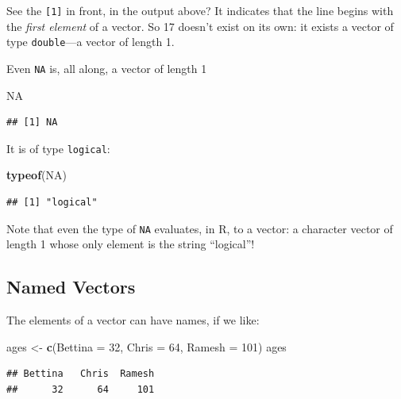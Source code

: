 \documentclass[]{book}
\makeatletter
\newenvironment{Shaded}{\begin{snugshade}}{\end{snugshade}}
\newcommand{\KeywordTok}[1]{\textcolor[rgb]{0.13,0.29,0.53}{\textbf{{#1}}}}
\newcommand{\DataTypeTok}[1]{\textcolor[rgb]{0.13,0.29,0.53}{{#1}}}
\newcommand{\DecValTok}[1]{\textcolor[rgb]{0.00,0.00,0.81}{{#1}}}
\newcommand{\StringTok}[1]{\textcolor[rgb]{0.31,0.60,0.02}{{#1}}}
\newcommand{\OtherTok}[1]{\textcolor[rgb]{0.56,0.35,0.01}{{#1}}}
\newcommand{\NormalTok}[1]{{#1}}
\newenvironment{kframe}{%
\medskip{}
\setlength{\fboxsep}{.8em}
 \def\at@end@of@kframe{}%
 \ifinner\ifhmode%
  \def\at@end@of@kframe{\end{minipage}}%
  \begin{minipage}{\columnwidth}%
 \fi\fi%
 \def\FrameCommand##1{\hskip\@totalleftmargin \hskip-\fboxsep
 \colorbox{shadecolor}{##1}\hskip-\fboxsep
     \hskip-\linewidth \hskip-\@totalleftmargin \hskip\columnwidth}%
 \MakeFramed {\advance\hsize-\width
   \@totalleftmargin\z@ \linewidth\hsize
   \@setminipage}}%
 {\par\unskip\endMakeFramed%
 \at@end@of@kframe}
\renewenvironment{Shaded}{\begin{kframe}}{\end{kframe}}
\theoremstyle{definition}
\theoremstyle{definition}
\theoremstyle{remark}
\makeatother
\begin{document}
See the \texttt{{[}1{]}} in front, in the output above? It indicates
that the line begins with the \emph{first element} of a vector. So 17
doesn't exist on its own: it exists a vector of type \texttt{double}---a
vector of length 1.

Even \texttt{NA} is, all along, a vector of length 1

\begin{Shaded}
\begin{Highlighting}[]
\OtherTok{NA}
\end{Highlighting}
\end{Shaded}

\begin{verbatim}
## [1] NA
\end{verbatim}

It is of type \texttt{logical}:

\begin{Shaded}
\begin{Highlighting}[]
\KeywordTok{typeof}\NormalTok{(}\OtherTok{NA}\NormalTok{)}
\end{Highlighting}
\end{Shaded}

\begin{verbatim}
## [1] "logical"
\end{verbatim}

Note that even the type of \texttt{NA} evaluates, in R, to a vector: a
character vector of length 1 whose only element is the string
``logical''!

\subsection{Named Vectors}\label{named-vectors}

The elements of a vector can have names, if we like:

\begin{Shaded}
\begin{Highlighting}[]
\NormalTok{ages <-}\StringTok{ }\KeywordTok{c}\NormalTok{(}\DataTypeTok{Bettina =} \DecValTok{32}\NormalTok{, }\DataTypeTok{Chris =} \DecValTok{64}\NormalTok{, }\DataTypeTok{Ramesh =} \DecValTok{101}\NormalTok{)}
\NormalTok{ages}
\end{Highlighting}
\end{Shaded}

\begin{verbatim}
## Bettina   Chris  Ramesh 
##      32      64     101
\end{verbatim}
\end{document}
